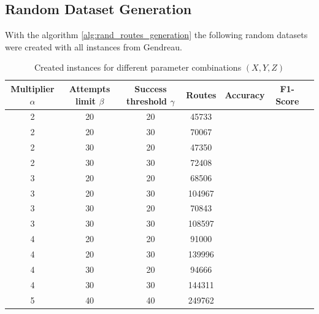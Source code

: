 \subsection{Random Dataset Generation}
With the algorithm \ref{alg:rand_routes_generation} the following random datasets were created with all
instances from Gendreau.
\begin{table}[h!]
    \centering
    \begin{tabular}{c c cc c c c}
        \hline
        Multiplier $\alpha$ & Attempts limit $\beta$ & Success threshold $\gamma$ & Routes & Accuracy & F1-Score \\
        \hline
        2                   & 20                     & 20                         & 45733  &          &          \\
        2                   & 20                     & 30                         & 70067  &          &          \\
        2                   & 30                     & 20                         & 47350  &          &          \\
        2                   & 30                     & 30                         & 72408  &          &          \\
        3                   & 20                     & 20                         & 68506  &          &          \\
        3                   & 20                     & 30                         & 104967 &          &          \\
        3                   & 30                     & 20                         & 70843  &          &          \\
        3                   & 30                     & 30                         & 108597 &          &          \\
        4                   & 20                     & 20                         & 91000  &          &          \\
        4                   & 20                     & 30                         & 139996 &          &          \\
        4                   & 30                     & 20                         & 94666  &          &          \\
        4                   & 30                     & 30                         & 144311 &          &          \\
        5                   & 40                     & 40                         & 249762 &          &          \\
        \hline
    \end{tabular}
    \caption{Created instances for different parameter combinations $(X, Y, Z)$}
    \label{tab:created_instances_xyz}
\end{table}

